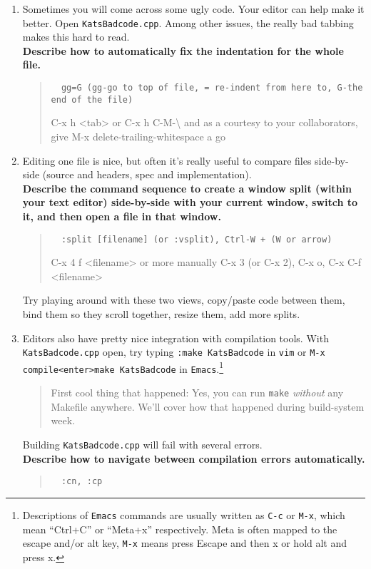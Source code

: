 \documentclass{article}
\begin{document}
\begin{enumerate}
  \item Sometimes you will come across some ugly code. Your editor can help
    make it better. Open \texttt{KatsBadcode.cpp}. Among other issues, the
    really bad tabbing makes this hard to read.\\
    \textbf{Describe how to automatically fix the indentation for the whole file.}
    \begin{quote}\tt
      {\color{blue} gg=G (gg-go to top of file, = re-indent from here to, G-the end of the file)}

      {\color{red} C-x h <tab>} or {\color{red}C-x h C-M-\textbackslash}
      and as a courtesy to your collaborators, \newline give {\color{red} M-x delete-trailing-whitespace} a go
    \end{quote}
  \item Editing one file is nice, but often it's really useful to compare
    files side-by-side (source and headers, spec and implementation).\\
    \textbf{Describe the command sequence to create a window split (within your
        text editor) side-by-side with your current window, switch to it, and then open a file in that window.}\\
    \begin{quote}\tt
      {\color{blue} :split [filename] (or :vsplit), Ctrl-W + (W or arrow)}

      {\color{red} C-x 4 f <filename>} or more manually {\color{red} C-x 3 (or C-x 2), C-x o, C-x C-f <filename>}
    \end{quote}

    Try playing around with these two views, copy/paste code between them,
    bind them so they scroll together, resize them, add more splits.\\
  \item Editors also have pretty nice integration with compilation tools. With
    \texttt{KatsBadcode.cpp} open, try typing \texttt{:make KatsBadcode} in
    \texttt{vim} or \texttt{M-x compile<enter>make KatsBadcode} in
    \texttt{Emacs}.\footnote{
      Descriptions of \texttt{Emacs} commands are usually written as
      \texttt{C-c} or \texttt{M-x}, which mean ``Ctrl+C'' or ``Meta+x''
      respectively. Meta is often mapped to the escape and/or alt key,
      \texttt{M-x} means press Escape and then x or hold alt and press x.
    }
    \begin{quote}
      First cool thing that happened: Yes, you can run \texttt{make}
      \emph{without} any Makefile anywhere. We'll cover how that happened
      during build-system week.
    \end{quote}
    Building \texttt{KatsBadcode.cpp} will fail with several errors.\\
    \textbf{Describe how to navigate between compilation errors automatically.}
    \begin{quote}\tt
      {\color{blue} :cn, :cp}


\end{quote}
\end{enumerate}
\end{document}
